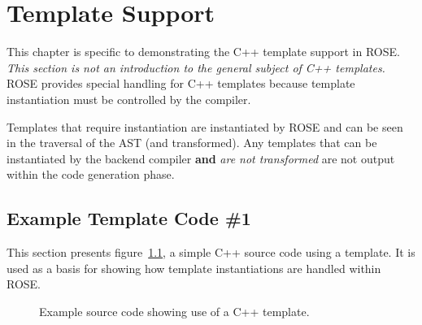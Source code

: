 \chapter{Template Support}

    This chapter is specific to demonstrating the C++ template support in ROSE. 
{\em This section is not an introduction to the general subject of C++ templates.} 
ROSE provides special handling for C++ templates because template instantiation 
must be controlled by the compiler.

   Templates that require instantiation are instantiated by ROSE and 
can be seen in the traversal of the AST (and transformed).  Any templates
that can be instantiated by the backend compiler {\bf and} {\em are not transformed}
are not output within the code generation phase.


\section{Example Template Code \#1}
     
   This section presents figure~\ref{Tutorial:exampleTemplate1}, a simple 
C++ source code using a template. It is used as a basis for showing how 
template instantiations are handled within ROSE.

\begin{figure}[!h]
{\indent
{\mySmallFontSize


\begin{latexonly}
   
\end{latexonly}

\begin{htmlonly}
   
\end{htmlonly}

}
}
\caption{Example source code showing use of a C++ template.}
\label{Tutorial:exampleTemplate1}
\end{figure}

